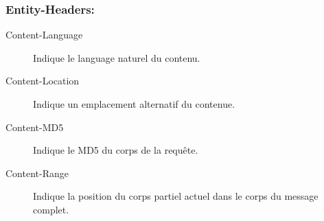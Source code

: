 \documentclass{scrreprt}
\begin{document}
\subsubsection{Entity-Headers:}
        \begin{description}              
        \item [Content-Language] Indique le language naturel du contenu.
        \item [Content-Location] Indique un emplacement alternatif du contenue.
        \item [Content-MD5] Indique le MD5 du corps de la requête.
        \item [Content-Range] Indique la position du corps partiel actuel dans le corps du message complet.
        \end{description}
 
\end{document}
